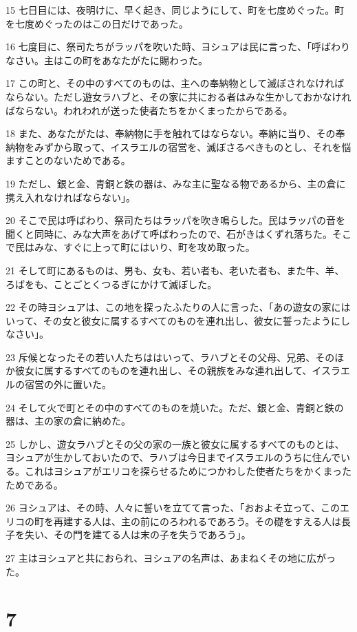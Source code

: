 \par 15 七日目には、夜明けに、早く起き、同じようにして、町を七度めぐった。町を七度めぐったのはこの日だけであった。
\par 16 七度目に、祭司たちがラッパを吹いた時、ヨシュアは民に言った、「呼ばわりなさい。主はこの町をあなたがたに賜わった。
\par 17 この町と、その中のすべてのものは、主への奉納物として滅ぼされなければならない。ただし遊女ラハブと、その家に共におる者はみな生かしておかなければならない。われわれが送った使者たちをかくまったからである。
\par 18 また、あなたがたは、奉納物に手を触れてはならない。奉納に当り、その奉納物をみずから取って、イスラエルの宿営を、滅ぼさるべきものとし、それを悩ますことのないためである。
\par 19 ただし、銀と金、青銅と鉄の器は、みな主に聖なる物であるから、主の倉に携え入れなければならない」。
\par 20 そこで民は呼ばわり、祭司たちはラッパを吹き鳴らした。民はラッパの音を聞くと同時に、みな大声をあげて呼ばわったので、石がきはくずれ落ちた。そこで民はみな、すぐに上って町にはいり、町を攻め取った。
\par 21 そして町にあるものは、男も、女も、若い者も、老いた者も、また牛、羊、ろばをも、ことごとくつるぎにかけて滅ぼした。
\par 22 その時ヨシュアは、この地を探ったふたりの人に言った、「あの遊女の家にはいって、その女と彼女に属するすべてのものを連れ出し、彼女に誓ったようにしなさい」。
\par 23 斥候となったその若い人たちははいって、ラハブとその父母、兄弟、そのほか彼女に属するすべてのものを連れ出し、その親族をみな連れ出して、イスラエルの宿営の外に置いた。
\par 24 そして火で町とその中のすべてのものを焼いた。ただ、銀と金、青銅と鉄の器は、主の家の倉に納めた。
\par 25 しかし、遊女ラハブとその父の家の一族と彼女に属するすべてのものとは、ヨシュアが生かしておいたので、ラハブは今日までイスラエルのうちに住んでいる。これはヨシュアがエリコを探らせるためにつかわした使者たちをかくまったためである。
\par 26 ヨシュアは、その時、人々に誓いを立てて言った、「おおよそ立って、このエリコの町を再建する人は、主の前にのろわれるであろう。その礎をすえる人は長子を失い、その門を建てる人は末の子を失うであろう」。
\par 27 主はヨシュアと共におられ、ヨシュアの名声は、あまねくその地に広がった。

\chapter{7}

